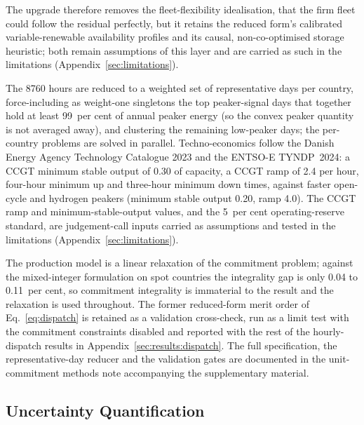 The upgrade therefore removes the fleet-flexibility idealisation,
that the firm fleet could follow the residual perfectly, but it retains the
reduced form's calibrated variable-renewable availability profiles and its causal,
non-co-optimised storage heuristic; both remain assumptions of this layer and are
carried as such in the limitations (Appendix~\ref{sec:limitations}).

The 8760 hours are reduced to a weighted set of representative
days per country, force-including as weight-one singletons the top peaker-signal days
that together hold at least 99~per cent of annual peaker energy (so the convex
peaker quantity is not averaged away), and clustering the remaining low-peaker days;
the per-country problems are solved in parallel. Techno-economics follow the Danish
Energy Agency Technology Catalogue 2023 \citep{DEA2023technology} and the ENTSO-E
TYNDP~2024: a CCGT minimum stable output of 0.30 of capacity, a CCGT ramp of 2.4 per
hour, four-hour minimum up and three-hour minimum down times, against faster
open-cycle and hydrogen peakers (minimum stable output 0.20, ramp 4.0). The CCGT
ramp and minimum-stable-output values, and the 5~per cent operating-reserve
standard, are judgement-call inputs carried as assumptions and tested in the
limitations (Appendix~\ref{sec:limitations}).

The production model is a linear
relaxation of the commitment problem; against the mixed-integer formulation on spot
countries the integrality gap is only 0.04 to 0.11~per cent, so commitment
integrality is immaterial to the result and the relaxation is used throughout. The
former reduced-form merit order of Eq.~\eqref{eq:dispatch} is retained as a validation
cross-check, run as a limit test with the commitment constraints disabled and
reported with the rest of the hourly-dispatch results in
Appendix~\ref{sec:results:dispatch}. The full specification, the representative-day
reducer and the validation gates are documented in the unit-commitment methods note
accompanying the supplementary material.


\subsection{Uncertainty Quantification}
\label{sec:method:uncertainty}

